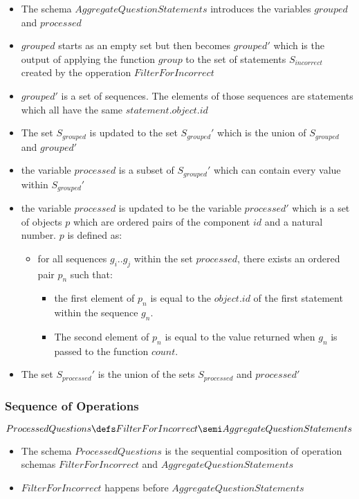 \documentclass{article}
\begin{document}
\begin{itemize}
\item The schema $AggregateQuestionStatements$ introduces the variables
  $grouped$ and $processed$
\item $grouped$ starts as an empty set but then becomes $grouped'$
  which is the output of applying the function $group$ to the set of statements
  $S_{incorrect}$ created by the opperation $FilterForIncorrect$
\item $grouped'$ is a set of sequences. The elements of those
  sequences are statements which all have the same
  $statement.object.id$

\item The set $S_{grouped}$ is updated to the set $S_{grouped}'$ which
  is the union of $S_{grouped}$ and $grouped'$
\item the variable $processed$ is a subset of $S_{grouped}'$ which can
  contain every value within $S_{grouped}'$
\item the variable $processed$ is updated to be the variable
  $processed'$ which is a set of objects $p$ which are ordered pairs
  of the component $id$ and a natural number. $p$ is defined as:
  \begin{itemize}
  \item for all sequences $g_{i}..g_{j}$ within the set $processed$,
    there exists an ordered pair $p_{n}$ such that:
    \begin{itemize}
    \item the first element of $p_{n}$ is equal to the $object.id$ of the first
      statement within the sequence $g_{n}$.
    \item The second element of $p_{n}$ is equal to the value returned
      when $g_{n}$ is passed to the function $count$.
    \end{itemize}
  \end{itemize}
\item The set $S_{processed}'$ is the union of the sets
  $S_{processed}$ and $processed'$
\end{itemize}

\subsubsection{Sequence of Operations}

$ProcessedQuestions \defs FilterForIncorrect \semi
AggregateQuestionStatements$

\begin{itemize}
\item The schema $ProcessedQuestions$ is the sequential composition
  of operation schemas $FilterForIncorrect$ and
  $AggregateQuestionStatements$
\item $FilterForIncorrect$ happens before $AggregateQuestionStatements$
\end{itemize}
\end{document}

